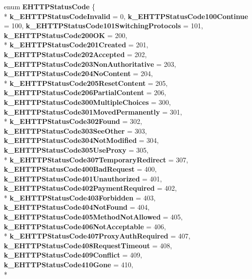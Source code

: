 \begin{DoxyCompactItemize}
\item 
\hypertarget{namespaceValve_1_1Steamworks_ab62fb77def417ee5c534d8dd0ccd7b7e}{}enum {\bfseries E\+H\+T\+T\+P\+Status\+Code} \{ \\*
{\bfseries k\+\_\+\+E\+H\+T\+T\+P\+Status\+Code\+Invalid} = 0, 
{\bfseries k\+\_\+\+E\+H\+T\+T\+P\+Status\+Code100\+Continue} = 100, 
{\bfseries k\+\_\+\+E\+H\+T\+T\+P\+Status\+Code101\+Switching\+Protocols} = 101, 
{\bfseries k\+\_\+\+E\+H\+T\+T\+P\+Status\+Code200\+O\+K} = 200, 
\\*
{\bfseries k\+\_\+\+E\+H\+T\+T\+P\+Status\+Code201\+Created} = 201, 
{\bfseries k\+\_\+\+E\+H\+T\+T\+P\+Status\+Code202\+Accepted} = 202, 
{\bfseries k\+\_\+\+E\+H\+T\+T\+P\+Status\+Code203\+Non\+Authoritative} = 203, 
{\bfseries k\+\_\+\+E\+H\+T\+T\+P\+Status\+Code204\+No\+Content} = 204, 
\\*
{\bfseries k\+\_\+\+E\+H\+T\+T\+P\+Status\+Code205\+Reset\+Content} = 205, 
{\bfseries k\+\_\+\+E\+H\+T\+T\+P\+Status\+Code206\+Partial\+Content} = 206, 
{\bfseries k\+\_\+\+E\+H\+T\+T\+P\+Status\+Code300\+Multiple\+Choices} = 300, 
{\bfseries k\+\_\+\+E\+H\+T\+T\+P\+Status\+Code301\+Moved\+Permanently} = 301, 
\\*
{\bfseries k\+\_\+\+E\+H\+T\+T\+P\+Status\+Code302\+Found} = 302, 
{\bfseries k\+\_\+\+E\+H\+T\+T\+P\+Status\+Code303\+See\+Other} = 303, 
{\bfseries k\+\_\+\+E\+H\+T\+T\+P\+Status\+Code304\+Not\+Modified} = 304, 
{\bfseries k\+\_\+\+E\+H\+T\+T\+P\+Status\+Code305\+Use\+Proxy} = 305, 
\\*
{\bfseries k\+\_\+\+E\+H\+T\+T\+P\+Status\+Code307\+Temporary\+Redirect} = 307, 
{\bfseries k\+\_\+\+E\+H\+T\+T\+P\+Status\+Code400\+Bad\+Request} = 400, 
{\bfseries k\+\_\+\+E\+H\+T\+T\+P\+Status\+Code401\+Unauthorized} = 401, 
{\bfseries k\+\_\+\+E\+H\+T\+T\+P\+Status\+Code402\+Payment\+Required} = 402, 
\\*
{\bfseries k\+\_\+\+E\+H\+T\+T\+P\+Status\+Code403\+Forbidden} = 403, 
{\bfseries k\+\_\+\+E\+H\+T\+T\+P\+Status\+Code404\+Not\+Found} = 404, 
{\bfseries k\+\_\+\+E\+H\+T\+T\+P\+Status\+Code405\+Method\+Not\+Allowed} = 405, 
{\bfseries k\+\_\+\+E\+H\+T\+T\+P\+Status\+Code406\+Not\+Acceptable} = 406, 
\\*
{\bfseries k\+\_\+\+E\+H\+T\+T\+P\+Status\+Code407\+Proxy\+Auth\+Required} = 407, 
{\bfseries k\+\_\+\+E\+H\+T\+T\+P\+Status\+Code408\+Request\+Timeout} = 408, 
{\bfseries k\+\_\+\+E\+H\+T\+T\+P\+Status\+Code409\+Conflict} = 409, 
{\bfseries k\+\_\+\+E\+H\+T\+T\+P\+Status\+Code410\+Gone} = 410, 
\\*

\end{DoxyCompactItemize}
